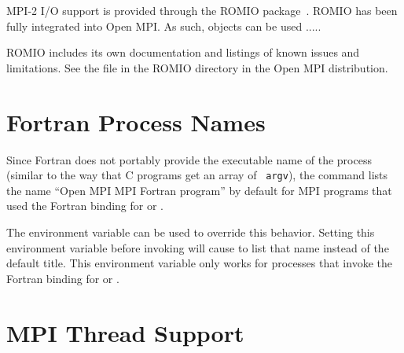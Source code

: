 MPI-2 I/O support is provided through the ROMIO
package~\cite{thak99a,thak99b}.  ROMIO has been fully integrated into
Open MPI.  As such,  objects can be used .....

ROMIO includes its own documentation and listings of known issues and
limitations.  See the  file in the ROMIO directory in the
Open MPI distribution.


\section{Fortran Process Names}

Since Fortran does not portably provide the executable name of the
process (similar to the way that C programs get an array of {\tt
  argv}), the  command lists the name ``Open MPI MPI Fortran
program'' by default for MPI programs that used the Fortran binding
for  or .

The environment variable  can
be used to override this behavior.
%
Setting this environment variable before invoking  will
cause  to list that name instead of the default title.
%
This environment variable only works for processes that invoke the
Fortran binding for  or
.


\section{MPI Thread Support}
\label{sec:misc-threads}

\def\mtsingle{\mpiconst{MPI\_\-THREAD\_\-SINGLE}}
\def\mtfunneled{\mpiconst{MPI\_\-THREAD\_\-FUNNELED}}
\def\mtserial{\mpiconst{MPI\_\-THREAD\_\-SERIALIZED}}
\def\mtmultiple{\mpiconst{MPI\_\-THREAD\_\-MULTIPLE}}
\def\mpiinit{\mpifunc{MPI\_\-INIT}}
\def\mpiinitthread{\mpifunc{MPI\_\-INIT\_\-THREAD}}

